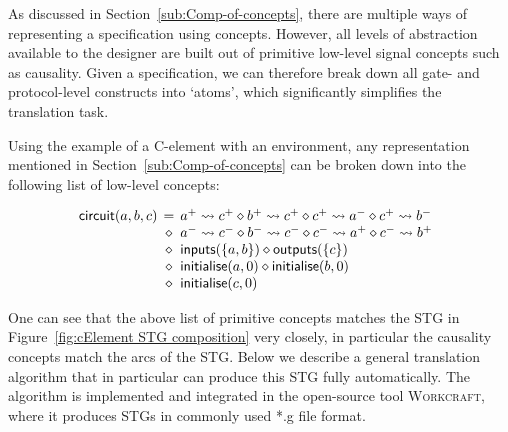 \documentclass[british, journal]{IEEEtran}
\newcommand{\noun}[1]{\textsc{#1}}
\begin{document}
As discussed in Section~\ref{sub:Comp-of-concepts}, there are multiple ways of
representing a specification using concepts. However, all levels of
abstraction available to the designer are built out of primitive low-level
signal concepts such as causality. Given a specification, we can therefore
break down all gate- and protocol-level constructs into `atoms', which
significantly simplifies the translation task.

Using the example of a C-element with an environment, any representation
mentioned in Section~\ref{sub:Comp-of-concepts} can be broken down into the
following list of low-level concepts:

\vspace{-3mm}
\[
\begin{array}{lcl}
\hspace{-2mm}\mathsf{circuit}(a,b,c)&\hspace{-2mm}=&\hspace{-2mm}a^{+}\rightsquigarrow c^{+} \diamond b^{+}\rightsquigarrow c^{+} \diamond c^{+}\rightsquigarrow a^{-} \diamond c^{+}
\rightsquigarrow b^{-}\\
~&\hspace{-2mm}\diamond&\hspace{-2mm}a^{-}\rightsquigarrow c^{-} \diamond b^{-}\rightsquigarrow c^{-} \diamond c^{-}\rightsquigarrow a^{+} \diamond c^{-}\rightsquigarrow b^{+}\\
~&\hspace{-2mm}\diamond&\hspace{-2mm}\mathsf{inputs}(\{a,b\})\diamond\mathsf{outputs}(\{c\})\\
~&\hspace{-2mm}\diamond&\hspace{-2mm}\mathsf{initialise}(a,0) \diamond \mathsf{initialise}(b,0)\\
~&\hspace{-2mm}\diamond&\hspace{-2mm}\mathsf{initialise}(c,0)
\end{array}
\]

\noindent One can see that the above list of primitive concepts matches
the STG in Figure~\ref{fig:cElement STG composition} very closely, in particular
the causality concepts match the arcs of the STG. Below we describe a general
translation algorithm that in particular can produce this STG fully automatically.
The algorithm is implemented and integrated in the open-source tool \noun{Workcraft},
where it produces STGs in commonly used \textsf{*.g} file format.
\end{document}
